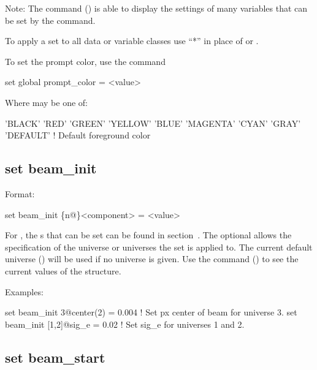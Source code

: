 {{Note: The  command () is able to display the settings of many variables
that can be set by the  command.

To apply a set to all data or variable classes use ``*'' in place of  or
.

To set the prompt color, use the command
\begin{example}
  set global prompt_color = <value>
\end{example}
Where  may be one of:
\begin{example}
  'BLACK'
  'RED'
  'GREEN'
  'YELLOW'
  'BLUE'
  'MAGENTA'
  'CYAN'
  'GRAY'
  'DEFAULT'       ! Default foreground color
\end{example}



\subsection{set beam_init}
\label{s:set.beam.init}

Format:
\begin{example}
  set beam_init \{n@\}<component> = <value>
\end{example}

For , the s that can be set can be found in
section~. The optional  allows the specification of the universe
or universes the set is applied to. The current default universe () will
be used if no universe is given. Use the  command () to see the
current values of the  structure.

Examples:
\begin{example}
  set beam_init 3@center(2) = 0.004  ! Set px center of beam for universe 3.
  set beam_init [1,2]@sig_e = 0.02   ! Set sig_e for universes 1 and 2.
\end{example}


\subsection{set beam_start}
\label{s:set.beam.start}

}}
